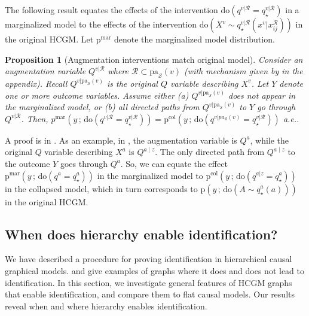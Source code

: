 \documentclass[12pt]{article}
\newtheorem{proposition}{Proposition}
\newcommand{\Sc}{\mathcal{S}}
\newcommand{\rmdo}{\mathrm{do}}
\newcommand{\s}{\, ; \,}
\newcommand{\pa}{\mathrm{pa}}
\newcommand{\pr}{\mathrm{p}}
\newcommand{\col}{\mathrm{col}}
\newcommand{\mar}{\mathrm{mar}}
\begin{document}
The following result equates the effects of the intervention $\rmdo(q^{v | \mathcal{R}} = q_\star^{v | \mathcal{R}})$ in a marginalized model to the effects of the intervention $\rmdo(X^{v} \sim q_\star^{v | \mathcal{R}}(x^v|x_{ij}^\mathcal{R}))$ in the original HCGM.
Let $\pr^{\mar}$ denote the marginalized model distribution.
\begin{proposition}[Augmentation interventions match original model] \label{prop:intervene_valid}
	Consider an augmentation variable $Q^{v | \mathcal{R}}$ where $\mathcal{R} \subset \pa_\Sc(v)$ (with mechanism given by  in the appendix).
	Recall $Q^{v | \pa_\Sc(v)}$ is the original $Q$ variable describing $X^{v}$.
	Let $Y$ denote one or more outcome variables.
	Assume either (a) $Q^{v | \pa_\Sc(v)}$ does not appear in the marginalized model, or (b) all directed paths from $Q^{v | \pa_\Sc(v)}$ to $Y$ go through $Q^{v | \mathcal{R}}$.
	Then, $p^{\mar}(y \s \rmdo(q^{v | \mathcal{R}} = q_\star^{v|\mathcal{R}})) = \pr^{\col}(y \s \rmdo(q^{v | pa_\Sc(v)} = q_\star^{v|\mathcal{R}}))$ a.e..
\end{proposition}
\noindent A proof is in . 
As an example, in , the augmentation variable is $Q^a$, while the original $Q$ variable describing $X^a$ is $Q^{a \mid z}$.
The only directed path from $Q^{a \mid z}$ to the outcome $Y$ goes through $Q^a$.
So, we can equate the effect $\pr^\mar(y \s \rmdo(q^a = q_\star^a))$ in the marginalized model to $\pr^\col(y \s \rmdo(q^{a |z} = q_\star^a))$ in the collapsed model, which in turn corresponds to $\pr(y \s \rmdo(A \sim q_\star^a(a)))$ in the original HCGM.


\subsection{When does hierarchy enable identification?} \label{sec:hierarchy_enables_id}

We have described a procedure for proving identification in hierarchical causal graphical models.  and  give examples of graphs where it does and does not lead to identification.
In this section, we investigate general features of HCGM graphs that enable identification, and compare them to flat causal models.
Our results reveal when and where hierarchy enables identification.
\end{document}
